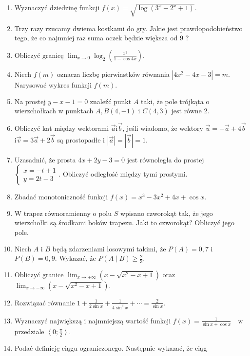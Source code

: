 \documentclass[10pt]{article}
\begin{document}
\begin{enumerate}
  \item Wyznaczyć dziedzinę funkcji \(f(x)=\sqrt{\log \left(3^{x}-2^{x}+1\right)}\).
  \item Trzy razy rzucamy dwiema kostkami do gry. Jakie jest prawdopodobieństwo tego, że co najmniej raz suma oczek będzie większa od 9 ?
  \item Obliczyć granicę \(\lim _{x \rightarrow 0} \log _{2}\left(\frac{x^{2}}{1-\cos 4 x}\right)\).
  \item Niech \(f(m)\) oznacza liczbę pierwiastków równania \(\left|4 x^{2}-4 x-3\right|=m\). Narysować wykres funkcji \(f(m)\).
  \item Na prostej \(y-x-1=0\) znaleźć punkt \(A\) taki, że pole trójkąta o wierzchołkach w punktach \(A, B(4,-1)\) i \(C(4,3)\) jest równe 2.
  \item Obliczyć kat między wektorami \(\vec{a} \mathrm{i} \vec{b}\), jeśli wiadomo, że wektory \(\vec{u}=-\vec{a}+4 \vec{b}\) \(\mathrm{i} \vec{v}=3 \vec{a}+2 \vec{b}\) są prostopadłe i \(|\vec{a}|=|\vec{b}|=1\).
  \item Uzasadnić, że prosta \(4 x+2 y-3=0\) jest równoległa do prostej \(\left\{\begin{array}{l}x=-t+1 \\ y=2 t-3\end{array}\right.\). Obliczyć odległość między tymi prostymi.
  \item Zbadać monotoniczność funkcji \(f(x)=x^{3}-3 x^{2}+4 x+\cos x\).
  \item W trapez równoramienny o polu \(S\) wpisano czworokąt tak, że jego wierzchołki są środkami boków trapezu. Jaki to czworokąt? Obliczyć jego pole.
  \item Niech \(A\) i \(B\) będą zdarzeniami losowymi takimi, że \(P(A)=0,7\) i \(P(B)=0,9\). Wykazać, że \(P(A \mid B) \geqslant \frac{2}{3}\).
  \item Obliczyć granice \(\lim _{x \rightarrow+\infty}\left(x-\sqrt{x^{2}-x+1}\right)\) oraz \(\lim _{x \rightarrow-\infty}\left(x-\sqrt{x^{2}-x+1}\right)\).
  \item Rozwiązać równanie \(1+\frac{1}{2 \sin x}+\frac{1}{4 \sin ^{2} x}+\cdots=\frac{2}{\sin x}\).
  \item Wyznaczyć największą i najmniejszą wartość funkcji \(f(x)=\frac{1}{\sin x+\cos x} \quad \mathrm{w}\) przedziale \(\left\langle 0 ; \frac{\pi}{2}\right\rangle\).
  \item Podać definicję ciągu ograniczonego. Następnie wykazać, że ciąg
\end{enumerate}
\end{document}

